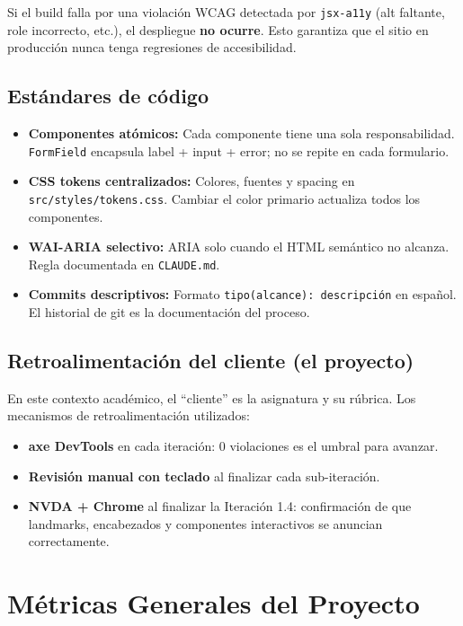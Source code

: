 \documentclass[12pt, a4paper]{article}
\begin{document}
Si el build falla por una violación WCAG detectada por \texttt{jsx-a11y} (alt faltante, role incorrecto, etc.), el despliegue \textbf{no ocurre}. Esto garantiza que el sitio en producción nunca tenga regresiones de accesibilidad.

\subsection{Estándares de código}

\begin{itemize}
  \item \textbf{Componentes atómicos:} Cada componente tiene una sola responsabilidad. \texttt{FormField} encapsula label + input + error; no se repite en cada formulario.
  \item \textbf{CSS tokens centralizados:} Colores, fuentes y spacing en \texttt{src/styles/tokens.css}. Cambiar el color primario actualiza todos los componentes.
  \item \textbf{WAI-ARIA selectivo:} ARIA solo cuando el HTML semántico no alcanza. Regla documentada en \texttt{CLAUDE.md}.
  \item \textbf{Commits descriptivos:} Formato \texttt{tipo(alcance): descripción} en español. El historial de git es la documentación del proceso.
\end{itemize}

\subsection{Retroalimentación del cliente (el proyecto)}

En este contexto académico, el ``cliente'' es la asignatura y su rúbrica. Los mecanismos de retroalimentación utilizados:
\begin{itemize}
  \item \textbf{axe DevTools} en cada iteración: 0 violaciones es el umbral para avanzar.
  \item \textbf{Revisión manual con teclado} al finalizar cada sub-iteración.
  \item \textbf{NVDA + Chrome} al finalizar la Iteración 1.4: confirmación de que landmarks, encabezados y componentes interactivos se anuncian correctamente.
\end{itemize}

\section{Métricas Generales del Proyecto}
\end{document}
